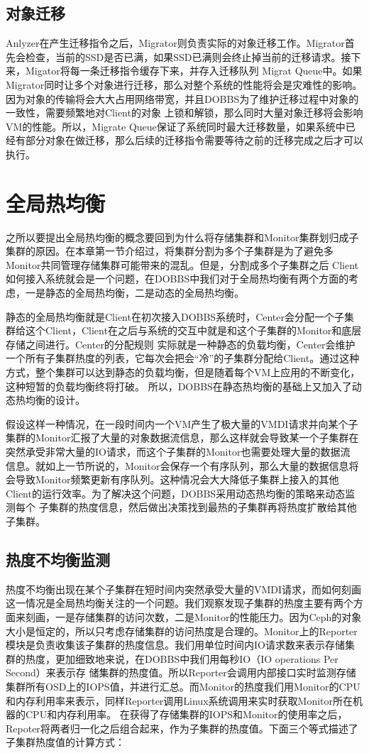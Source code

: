 \subsection{对象迁移}
Anlyzer在产生迁移指令之后，Migrator则负责实际的对象迁移工作。Migrator首先会检查，当前的SSD是否已满，如果SSD已满则会终止掉当前的迁移请求。接下来，Migator将每一条迁移指令缓存下来，并存入迁移队列
Migrat Queue中。如果Migrator同时让多个对象进行迁移，那么对整个系统的性能将会是灾难性的影响。因为对象的传输将会大大占用网络带宽，并且DOBBS为了维护迁移过程中对象的一致性，需要频繁地对Client的对象
上锁和解锁，那么同时大量对象迁移将会影响VM的性能。所以，Migrate Queue保证了系统同时最大迁移数量，如果系统中已经有部分对象在做迁移，那么后续的迁移指令需要等待之前的迁移完成之后才可以执行。

\section{全局热均衡}
之所以要提出全局热均衡的概念要回到为什么将存储集群和Monitor集群划归成子集群的原因。在本章第一节介绍过，将集群分割为多个子集群是为了避免多Monitor共同管理存储集群可能带来的混乱。但是，分割成多个子集群之后
Client如何接入系统就会是一个问题，在DOBBS中我们对于全局热均衡有两个方面的考虑，一是静态的全局热均衡，二是动态的全局热均衡。

静态的全局热均衡就是Client在初次接入DOBBS系统时，Center会分配一个子集群给这个Client，Client在之后与系统的交互中就是和这个子集群的Monitor和底层存储之间进行。Center的分配规则
实际就是一种静态的负载均衡，Center会维护一个所有子集群热度的列表，它每次会把会“冷”的子集群分配给Client。通过这种方式，整个集群可以达到静态的负载均衡，但是随着每个VM上应用的不断变化，这种短暂的负载均衡终将打破。
所以，DOBBS在静态热均衡的基础上又加入了动态热均衡的设计。

假设这样一种情况，在一段时间内一个VM产生了极大量的VMDI请求并向某个子集群的Monitor汇报了大量的对象数据流信息，那么这样就会导致某一个子集群在突然承受非常大量的IO请求，而这个子集群的Monitor也需要处理大量的数据流
信息。就如上一节所说的，Monitor会保存一个有序队列，那么大量的数据信息将会导致Monitor频繁更新有序队列。这种情况会大大降低子集群上接入的其他Client的运行效率。为了解决这个问题，DOBBS采用动态热均衡的策略来动态监测每个
子集群的热度信息，然后做出决策找到最热的子集群再将热度扩散给其他子集群。

\subsection{热度不均衡监测}
热度不均衡出现在某个子集群在短时间内突然承受大量的VMDI请求，而如何刻画这一情况是全局热均衡关注的一个问题。我们观察发现子集群的热度主要有两个方面来刻画，一是存储集群的访问次数，二是Monitor的性能压力。因为Ceph的对象
大小是恒定的，所以只考虑存储集群的访问热度是合理的。Monitor上的Reporter模块是负责收集该子集群的热度信息。我们用单位时间内IO请求数来表示存储集群的热度，更加细致地来说，在DOBBS中我们用每秒IO（IO operations Per Second）来表示存
储集群的热度值。所以Reporter会调用内部接口实时监测存储集群所有OSD上的IOPS值，并进行汇总。而Monitor的热度我们用Monitor的CPU和内存利用率来表示，同样Reporter调用Linux系统调用来实时获取Monitor所在机器的CPU和内存利用率。
在获得了存储集群的IOPS和Monitor的使用率之后，Repoter将两者归一化之后组合起来，作为子集群的热度值。下面三个等式描述了子集群热度值的计算方式：

